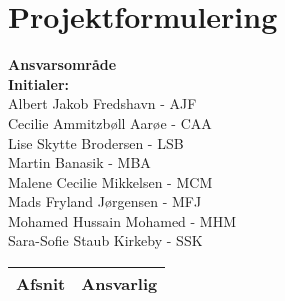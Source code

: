 \chapter{Projektformulering}




\textbf{Ansvarsområde} \\
\textbf{Initialer: } \\
Albert Jakob Fredshavn - AJF \\
Cecilie Ammitzbøll Aarøe - CAA \\
Lise Skytte Brodersen - LSB \\
Martin Banasik - MBA \\
Malene Cecilie Mikkelsen - MCM \\
Mads Fryland Jørgensen - MFJ \\
Mohamed Hussain Mohamed - MHM \\
Sara-Sofie Staub Kirkeby - SSK \\[2ex]


\begin{longtabu} to 
    Afsnit &    Ansvarlig\\[-1ex]
    \midrule
     
    
    

\end{longtabu}